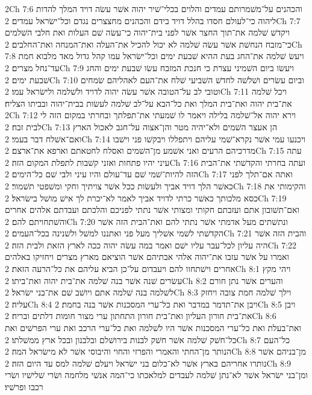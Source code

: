 2Ch 7:6  והכהנים על־משׁמרותם עמדים והלוים בכלי־שׁיר יהוה אשׁר עשׂה דויד המלך להדות ליהוה כי־לעולם חסדו בהלל דויד בידם והכהנים מחצצרים נגדם וכל־ישׂראל עמדים׃
2Ch 7:7  ויקדשׁ שׁלמה את־תוך החצר אשׁר לפני בית־יהוה כי־עשׂה שׁם העלות ואת חלבי השׁלמים כי־מזבח הנחשׁת אשׁר עשׂה שׁלמה לא יכול להכיל את־העלה ואת־המנחה ואת־החלבים׃
2Ch 7:8  ויעשׂ שׁלמה את־החג בעת ההיא שׁבעת ימים וכל־ישׂראל עמו קהל גדול מאד מלבוא חמת עד־נחל מצרים׃
2Ch 7:9  ויעשׂו ביום השׁמיני עצרת כי חנכת המזבח עשׂו שׁבעת ימים והחג שׁבעת ימים׃
2Ch 7:10  וביום עשׂרים ושׁלשׁה לחדשׁ השׁביעי שׁלח את־העם לאהליהם שׂמחים וטובי לב על־הטובה אשׁר עשׂה יהוה לדויד ולשׁלמה ולישׂראל עמו׃
2Ch 7:11  ויכל שׁלמה את־בית יהוה ואת־בית המלך ואת כל־הבא על־לב שׁלמה לעשׂות בבית־יהוה ובביתו הצליח׃
2Ch 7:12  וירא יהוה אל־שׁלמה בלילה ויאמר לו שׁמעתי את־תפלתך ובחרתי במקום הזה לי לבית זבח׃
2Ch 7:13  הן אעצר השׁמים ולא־יהיה מטר והן־אצוה על־חגב לאכול הארץ ואם־אשׁלח דבר בעמי׃
2Ch 7:14  ויכנעו עמי אשׁר נקרא־שׁמי עליהם ויתפללו ויבקשׁו פני וישׁבו מדרכיהם הרעים ואני אשׁמע מן־השׁמים ואסלח לחטאתם וארפא את־ארצם׃
2Ch 7:15  עתה עיני יהיו פתחות ואזני קשׁבות לתפלת המקום הזה׃
2Ch 7:16  ועתה בחרתי והקדשׁתי את־הבית הזה להיות־שׁמי שׁם עד־עולם והיו עיני ולבי שׁם כל־הימים׃
2Ch 7:17  ואתה אם־תלך לפני כאשׁר הלך דויד אביך ולעשׂות ככל אשׁר צויתיך וחקי ומשׁפטי תשׁמור׃
2Ch 7:18  והקימותי את כסא מלכותך כאשׁר כרתי לדויד אביך לאמר לא־יכרת לך אישׁ מושׁל בישׂראל׃
2Ch 7:19  ואם־תשׁובון אתם ועזבתם חקותי ומצותי אשׁר נתתי לפניכם והלכתם ועבדתם אלהים אחרים והשׁתחויתם להם׃
2Ch 7:20  ונתשׁתים מעל אדמתי אשׁר נתתי להם ואת־הבית הזה אשׁר הקדשׁתי לשׁמי אשׁליך מעל פני ואתננו למשׁל ולשׁנינה בכל־העמים׃
2Ch 7:21  והבית הזה אשׁר היה עליון לכל־עבר עליו ישׁם ואמר במה עשׂה יהוה ככה לארץ הזאת ולבית הזה׃
2Ch 7:22  ואמרו על אשׁר עזבו את־יהוה אלהי אבתיהם אשׁר הוציאם מארץ מצרים ויחזיקו באלהים אחרים וישׁתחוו להם ויעבדום על־כן הביא עליהם את כל־הרעה הזאת׃
2Ch 8:1  ויהי מקץ עשׂרים שׁנה אשׁר בנה שׁלמה את־בית יהוה ואת־ביתו׃
2Ch 8:2  והערים אשׁר נתן חורם לשׁלמה בנה שׁלמה אתם ויושׁב שׁם את־בני ישׂראל׃
2Ch 8:3  וילך שׁלמה חמת צובה ויחזק עליה׃
2Ch 8:4  ויבן את־תדמר במדבר ואת כל־ערי המסכנות אשׁר בנה בחמת׃
2Ch 8:5  ויבן את־בית חורון העליון ואת־בית חורון התחתון ערי מצור חומות דלתים ובריח׃
2Ch 8:6  ואת־בעלת ואת כל־ערי המסכנות אשׁר היו לשׁלמה ואת כל־ערי הרכב ואת ערי הפרשׁים ואת כל־חשׁק שׁלמה אשׁר חשׁק לבנות בירושׁלם ובלבנון ובכל ארץ ממשׁלתו׃
2Ch 8:7  כל־העם הנותר מן־החתי והאמרי והפרזי והחוי והיבוסי אשׁר לא מישׂראל המה׃
2Ch 8:8  מן־בניהם אשׁר נותרו אחריהם בארץ אשׁר לא־כלום בני ישׂראל ויעלם שׁלמה למס עד היום הזה׃
2Ch 8:9  ומן־בני ישׂראל אשׁר לא־נתן שׁלמה לעבדים למלאכתו כי־המה אנשׁי מלחמה ושׂרי שׁלישׁיו ושׂרי רכבו ופרשׁיו׃

